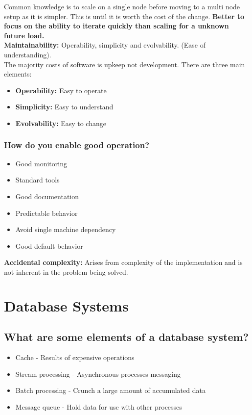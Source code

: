\documentclass[11pt]{scrartcl} %
\begin{document}
Common knowledge is to scale on a single node before moving to a multi node setup as it is simpler. This is until it
is worth the cost of the change. \textbf{Better to focus on the ability to iterate quickly than scaling for a unknown future
load.}\\

\textbf{Maintainability:} Operability, simplicity and evolvability. (Ease of understanding).\\

The majority costs of software is upkeep not development. There are three main elements:

\begin{itemize}
	\item \textbf{Operability:} Easy to operate
	\item \textbf{Simplicity:} Easy to understand
	\item \textbf{Evolvability:} Easy to change
\end{itemize}

\subsubsection{How do you enable good operation?}

\begin{itemize}
	\item Good monitoring
	\item Standard tools
	\item Good documentation
	\item Predictable behavior
	\item Avoid single machine dependency
	\item Good default behavior
\end{itemize}

\textbf{Accidental complexity:} Arises from complexity of the implementation and is not inherent in the problem being
solved.

\section{Database Systems}

\subsection{What are some elements of a database system?}

\begin{itemize}
	\item Cache - Results of expensive operations
	\item Stream processing - Asynchronous processes messaging
	\item Batch processing - Crunch a large amount of accumulated data
	\item Message queue - Hold data for use with other processes
\end{itemize}
\end{document}
